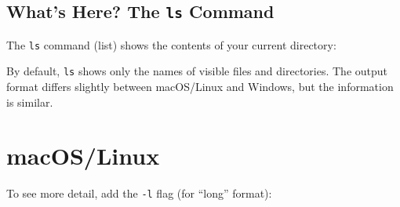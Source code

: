 \documentclass[
  letterpaper,
  DIV=11,
  numbers=noendperiod]{scrreprt}
\newenvironment{Shaded}{\begin{snugshade}}{\end{snugshade}}
\newcommand{\AttributeTok}[1]{\textcolor[rgb]{0.40,0.45,0.13}{#1}}
\newcommand{\ExtensionTok}[1]{\textcolor[rgb]{0.00,0.23,0.31}{#1}}
\newcommand{\NormalTok}[1]{\textcolor[rgb]{0.00,0.23,0.31}{#1}}
\begin{document}
\subsection{\texorpdfstring{What's Here? The \texttt{ls}
Command}{What's Here? The ls Command}}\label{whats-here-the-ls-command}

The \texttt{ls} command (list) shows the contents of your current
directory:

\begin{codelisting}

\caption{\texttt{terminal}}

\begin{Shaded}
\end{Shaded}

\end{codelisting}

By default, \texttt{ls} shows only the names of visible files and
directories. The output format differs slightly between macOS/Linux and
Windows, but the information is similar.

\section{macOS/Linux}

To see more detail, add the \texttt{-l} flag (for ``long'' format):

\begin{codelisting}

\caption{\texttt{terminal}}

\begin{Shaded}
\end{Shaded}

\end{codelisting}
\end{document}
